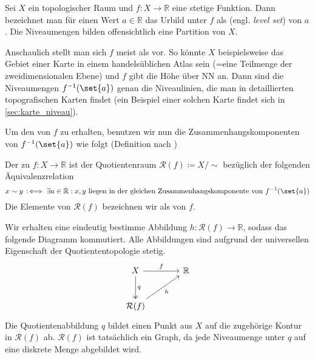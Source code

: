 Sei $X$ ein topologischer Raum und $f \colon X \to \mathbb{R}$ eine stetige Funktion.
Dann bezeichnet man für einen Wert $a \in \mathbb{R}$ das Urbild unter $f$ als  (engl. \emph{level set}) von $a$.
Die Niveaumengen bilden offensichtlich eine Partition von $X$.

Anschaulich stellt man sich $f$ meist als  vor. 
So könnte $X$ beispielsweise das Gebiet einer Karte in einem handelsüblichen Atlas sein (=eine Teilmenge der zweidimensionalen Ebene) und $f$ gibt die Höhe über NN an.
Dann sind die Niveaumengen $f^{-1}(\set{a})$ genau die Niveaulinien, die man in detaillierten topografischen Karten findet (ein Beispiel einer solchen Karte findet sich in \cref{sec:karte_niveau}).

Um den  von $f$ zu erhalten, benutzen wir nun die Zusammenhangskomponenten von $f^{-1}(\set{a})$ wie folgt (Definition nach \textcite[.4]{compTopo})

\begin{definition}[{name=[Reeb-Graph]}]
	Der  zu $f \colon X \to \mathbb{R}$ ist der Quotientenraum $\mathcal{R}(f) \coloneqq X/{\sim}$ bezüglich der folgenden Äquivalenzrelation
	\[
		x \sim y \,:\mkern-3mu\iff \exists a \in \mathbb{R} : x,y \text{ liegen in der gleichen Zusammenhangskomponente von } f^{-1}(\set{a}) 
	\]
	Die Elemente von $\mathcal{R}(f)$ bezeichnen wir als  von $f$.
\end{definition}
Wir erhalten eine eindeutig bestimme Abbildung $h \colon \mathcal{R}(f) \to \mathbb{R}$, sodass das folgende Diagramm kommutiert.
Alle Abbildungen sind aufgrund der universellen Eigenschaft der Quotiententopologie stetig.
\[
	\begin{tikzcd}[sep=large]
		X \rar["f"] \dar["q",two heads] & \mathbb{R} \\
		\mathcal{R}(f) \urar["h"']
	\end{tikzcd}
\]
Die Quotientenabbildung $q$ bildet einen Punkt aus $X$ auf die zugehörige Kontur in $\mathcal{R}(f)$ ab.
$\mathcal{R}(f)$ ist tatsächlich ein Graph, da jede Niveaumenge unter $q$ auf eine diskrete Menge abgebildet wird.

